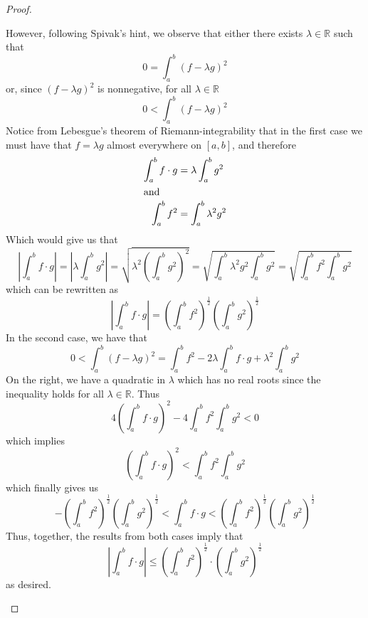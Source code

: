 \begin{enumerate}
\begin{proof}
\begin{enumerate}
        \hfill
        
        However, following Spivak's hint, we observe that either there exists \( \lambda \in \mathbb{R} \) such that
        \[
        0 = \int_a^b (f-\lambda g)^2
        \]
        or, since \( (f-\lambda g)^2 \) is nonnegative, for all \( \lambda \in \mathbb{R} \)
        \[
        0 < \int_a^b (f-\lambda g)^2
        \]
        Notice from Lebesgue's theorem of Riemann-integrability that in the first case we must have that \( f=\lambda g \) almost everywhere on \( [a,b] \), and therefore
        \begin{align*}
            \int_a^b f\cdot g &= \lambda \int_a^b g^2 \\
            \intertext{and}
            \int_a^b f^2 &= \int_a^b \lambda^2 g^2
        \end{align*}
        Which would give us that
        \[
        \left| \int_a^b f\cdot g \right| = \left| \lambda \int_a^b g^2 \right| = \sqrt{\lambda^2 \left(\int_a^b g^2\right)^2} = \sqrt{\int_a^b \lambda^2 g^2 \int_a^b g^2} = \sqrt{\int_a^b f^2 \int_a^b g^2 }
        \]
        which can be rewritten as
        \[
        \left| \int_a^b f\cdot g \right| = \left( \int_a^b f^2 \right)^{\frac{1}{2}} \left( \int_a^b g^2 \right)^{\frac{1}{2}}
        \]
        In the second case, we have that
        \[
        0 < \int_a^b (f-\lambda g)^2 = \int_a^b f^2 -2\lambda \int_a^b f\cdot g + \lambda^2 \int_a^b g^2
        \]
        On the right, we have a quadratic in \( \lambda \) which has no real roots since the inequality holds for all \( \lambda \in \mathbb{R} \). Thus
        \[
        4\left( \int_a^b f\cdot g \right)^2-4\int_a^b f^2 \int_a^b g^2 < 0
        \]
        which implies
        \[
        \left( \int_a^b f \cdot g \right)^2 < \int_a^b f^2 \int_a^b g^2
        \]
        which finally gives us
        \[
        -\left(\int_a^b f^2 \right)^{\frac{1}{2}} \left(\int_a^b g^2\right)^{\frac{1}{2}} < \int_a^b f \cdot g < \left(\int_a^b f^2\right)^{\frac{1}{2}} \left( \int_a^b g^2\right)^{\frac{1}{2}}
        \]
        Thus, together, the results from both cases imply that
        \[
        \left| \int_a^b f\cdot g \right| \leq \left( \int_a^b f^2 \right)^{\frac{1}{2}} \cdot \left( \int_a^b g^2 \right)^{\frac{1}{2}}
        \]
        as desired.
        

\end{enumerate}
\end{proof}
\end{enumerate}
